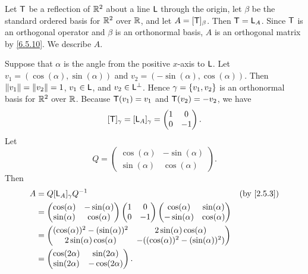 \begin{eg}\label{6.5.12}
	Let \(\mathsf{T}\) be a reflection of \(\mathbb{R}^2\) about a line \(\mathsf{L}\) through the origin, let \(\beta\) be the standard ordered basis for \(\mathbb{R}^2\) over \(\mathbb{R}\), and let \(A = [\mathsf{T}]_{\beta}\).
	Then \(\mathsf{T} = \mathsf{L}_A\).
	Since \(\mathsf{T}\) is an orthogonal operator and \(\beta\) is an orthonormal basis, \(A\) is an orthogonal matrix by \cref{6.5.10}.
	We describe \(A\).

	Suppose that \(\alpha\) is the angle from the positive \(x\)-axis to \(\mathsf{L}\).
	Let \(v_1 = (\cos(\alpha), \sin(\alpha))\) and \(v_2 = (-\sin(\alpha), \cos(\alpha))\).
	Then \(\left\lVert v_1\right\rVert = \left\lVert v_2\right\rVert = 1\), \(v_1 \in \mathsf{L}\), and \(v_2 \in \mathsf{L}^{\perp}\).
	Hence \(\gamma = \left\lbrace v_1, v_2\right\rbrace\) is an orthonormal basis for \(\mathbb{R}^2\) over \(\mathbb{R}\).
	Because \(\mathsf{T}(v_1) = v_1\) and \(\mathsf{T}(v_2) = -v_2\), we have
	\[
		[\mathsf{T}]_{\gamma} = [\mathsf{L}_A]_{\gamma} = \begin{pmatrix}
			1 & 0  \\
			0 & -1
		\end{pmatrix}.
	\]
	Let
	\[
		Q = \begin{pmatrix}
			\cos(\alpha) & -\sin(\alpha) \\
			\sin(\alpha) & \cos(\alpha)
		\end{pmatrix}.
	\]
	Then
	\begin{align*}
		A & = Q [\L_A]_{\gamma} Q^{-1}                                                      &  & \by{2.5.3} \\
		  & = \begin{pmatrix}
			      \cos(\alpha) & -\sin(\alpha) \\
			      \sin(\alpha) & \cos(\alpha)
		      \end{pmatrix} \begin{pmatrix}
			                    1 & 0  \\
			                    0 & -1
		                    \end{pmatrix} \begin{pmatrix}
			                                  \cos(\alpha)  & \sin(\alpha) \\
			                                  -\sin(\alpha) & \cos(\alpha)
		                                  \end{pmatrix}                                      \\
		  & = \begin{pmatrix}
			      (\cos(\alpha))^2 - (\sin(\alpha))^2 & 2 \sin(\alpha) \cos(\alpha)            \\
			      2 \sin(\alpha) \cos(\alpha)         & -((\cos(\alpha))^2 - (\sin(\alpha))^2)
		      \end{pmatrix}                  \\
		  & = \begin{pmatrix}
			      \cos(2 \alpha) & \sin(2 \alpha)  \\
			      \sin(2 \alpha) & -\cos(2 \alpha)
		      \end{pmatrix}.
	\end{align*}
\end{eg}

